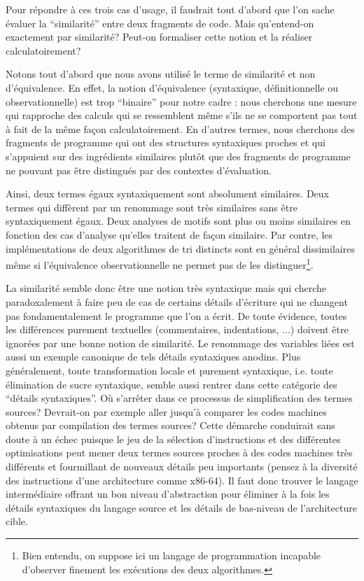 \medskip

Pour répondre à ces trois cas d'usage, il faudrait tout d'abord que
l'on sache évaluer la ``similarité'' entre deux fragments de
code. Mais qu'entend-on exactement par similarité? Peut-on
formaliser cette notion et la réaliser calculatoirement?

Notons tout d'abord que nous avons utilisé le terme de similarité et
non d'équivalence. En effet, la notion d'équivalence (syntaxique,
définitionnelle ou observationnelle) est trop ``binaire'' pour notre
cadre : nous cherchons une mesure qui rapproche des calculs qui se
ressemblent même s'ils ne se comportent pas tout à fait de la même
façon calculatoirement. En d'autres termes, nous cherchons des
fragments de programme qui ont des structures syntaxiques proches et
qui s'appuient sur des ingrédients similaires plutôt que des fragments
de programme ne pouvant pas être distingués par des contextes
d'évaluation.

Ainsi, deux termes égaux syntaxiquement sont absolument similaires.
Deux termes qui diffèrent par un renommage sont très similaires sans
être syntaxiquement égaux. Deux analyses de motifs sont plus ou
moins similaires en fonction des cas d'analyse qu'elles traitent
de façon similaire. Par contre, les implémentations de deux
algorithmes de tri distincts sont en général dissimilaires
même si l'équivalence observationnelle ne permet pas de les
distinguer\footnote{Bien entendu, on suppose ici
un langage de programmation incapable d'observer finement
les exécutions des deux algorithmes.}.

La similarité semble donc être une notion très syntaxique mais qui
cherche paradoxalement à faire peu de cas de certains détails
d'écriture qui ne changent pas fondamentalement le programme que l'on
a écrit. De toute évidence, toutes les différences purement textuelles
(commentaires, indentations, ...) doivent être ignorées par une bonne
notion de similarité. Le renommage des variables liées est aussi un
exemple canonique de tels détails syntaxiques anodins. Plus
généralement, toute transformation locale et purement syntaxique,
i.e. toute élimination de sucre syntaxique, semble aussi rentrer dans
cette catégorie des ``détails syntaxiques''. Où s'arrêter dans ce
processus de simplification des termes sources? Devrait-on par exemple aller
jusqu'à comparer les codes machines obtenus par compilation des termes
sources? Cette démarche conduirait sans doute à un échec puisque le
jeu de la sélection d'instructions et des différentes optimisations
peut mener deux termes sources proches à des codes machines très différents
et fourmillant de nouveaux détails peu importants (pensez à la
diversité des instructions d'une architecture comme x86-64). Il faut
donc trouver le langage intermédiaire offrant un bon niveau
d'abstraction pour éliminer à la fois les détails syntaxiques
du langage source et les détails de bas-niveau de l'architecture cible.

